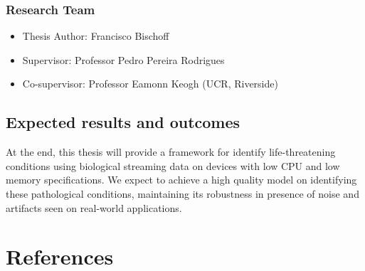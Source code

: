 \documentclass[runningheads]{llncs}
\providecommand{\tightlist}{%
  \setlength{\itemsep}{0pt}\setlength{\parskip}{0pt}}
\begin{document}
\hypertarget{research-team}{%
\subsubsection{Research Team}\label{research-team}}

\begin{itemize}
\tightlist
\item
  Thesis Author: Francisco Bischoff
\item
  Supervisor: Professor Pedro Pereira Rodrigues
\item
  Co-supervisor: Professor Eamonn Keogh (UCR, Riverside)
\end{itemize}

\hypertarget{expected-results-and-outcomes}{%
\subsection{Expected results and outcomes}\label{expected-results-and-outcomes}}

At the end, this thesis will provide a framework for identify life-threatening conditions using
biological streaming data on devices with low CPU and low memory specifications. We expect
to achieve a high quality model on identifying these pathological conditions, maintaining its
robustness in presence of noise and artifacts seen on real-world applications.

\hypertarget{references}{%
\section*{References}\label{references}}
\end{document}
